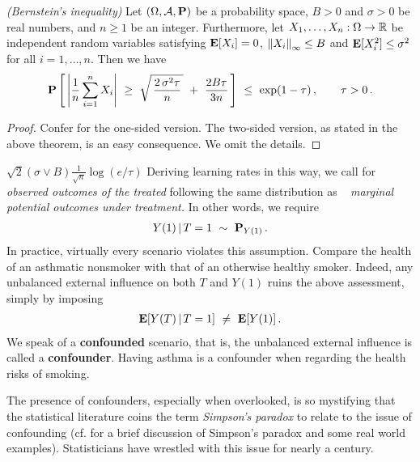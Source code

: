\begin{theorem}
  \emph{(Bernstein's inequality)}
  Let
  $
  (\Omega,\mathcal{A},\P)
  $ 
  be a probability space, 
  $
  B>0
  $ 
  and
  $
  \sigma>0
  $
  be real numbers,
  and
  $
  n\ge 1
  $
  be an integer.
  Furthermore, 
  let
  $
  X_1,\ldots,X_n
  :
  \Omega
  \to
  \R
  $
  be independent random variables satisfying
  $
  \E[X_i]=0
  $,
  $
  \norm{X_i}_\infty
  \le
  B
  $
  and
  $
  \E[X_i^2]\le \sigma^2
  $
  for all 
  $
  i=1,\ldots,n
  $.
  Then we have
  \begin{gather*}
    \P
    \left[ 
      \,
      \left| 
      \frac{1}{n}
        \sum_{i=1}^{n} 
        X_i
      \right|
      \ 
      \ge
      \ 
      \sqrt{
        \,
        \frac{2\,\sigma^2 \tau}{n}
        \,
      }
      \ 
      +
      \
      \frac{2 B \tau}{3n}
      \,
    \right]
    \ 
    \le
    \ 
    \exp(1-\tau)
    \,
    ,
    \qquad
    \tau>0\,.
  \end{gather*}
\end{theorem}
\begin{proof}
  Confer \cite[Theorem~6.12]{Steinwart2008}
  for the one-sided version. 
  The two-sided version, as stated in the above theorem, is an easy consequence. We omit the details.
\end{proof}
$
\sqrt{2}(\sigma\lor B)\frac{1}{\sqrt{n}}
\log(e/\tau)
$
Deriving learning rates in this way, we call for \textit{observed outcomes of the treated}
following the same distribution as
~\textit{
marginal potential outcomes under treatment.}
In other words, we require
\begin{gather}
  Y(1)\,|\,T=1
  \ 
  \sim 
  \ 
  \P_
  {
  Y(1)
  }
  \,.
\end{gather}
In practice, virtually every scenario violates this assumption.
Compare the health of an asthmatic nonsmoker with that of an otherwise healthy smoker.
  Indeed, any unbalanced external influence on both $T$ and $Y(1)$ ruins the 
above assessment, simply by imposing 
\begin{gather}
  \E[Y(T)\,|\, T=1]\ \neq\  \E[Y(1)]
  \,.
\end{gather}
We speak of a \textbf{confounded} scenario, that is, the unbalanced external influence is called a \textbf{confounder}. Having asthma  is a confounder when regarding the health risks of smoking.

The presence of confounders, especially when overlooked, is so mystifying that the statistical literature coins the term \textit{Simpson's paradox} to relate to the issue of confounding (cf.\cite{Wagner1982} for a brief discussion of Simpson's paradox and some real world examples).
Statisticians have wrestled with this issue for nearly a century.

